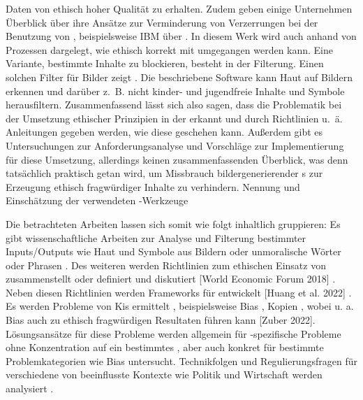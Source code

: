 Daten von ethisch hoher Qualität zu erhalten.
Zudem geben einige Unternehmen Überblick über ihre Ansätze zur Verminderung von Verzerrungen bei der Benutzung von , 
beispielsweise IBM über \cite{Hobson}. In diesem Werk wird auch anhand von Prozessen dargelegt, wie ethisch korrekt mit  
umgegangen werden kann.
Eine Variante, bestimmte Inhalte zu blockieren, besteht in der Filterung. Einen solchen Filter für Bilder zeigt \cite{Zheng}.
Die beschriebene Software kann Haut auf Bildern erkennen und darüber z. B. nicht kinder- und jugendfreie Inhalte und Symbole herausfiltern.
Zusammenfassend lässt sich also sagen, dass die Problematik bei der Umsetzung ethischer Prinzipien in der  erkannt und
durch Richtlinien u. ä. Anleitungen gegeben werden, wie diese geschehen kann. Außerdem gibt es Untersuchungen 
zur Anforderungsanalyse und Vorschläge zur Implementierung für diese Umsetzung, allerdings keinen zusammenfassenden 
Überblick, was denn tatsächlich praktisch getan wird, um Missbrauch bildergenerierender s zur Erzeugung ethisch 
fragwürdiger Inhalte zu verhindern.
Nennung und Einschätzung der verwendeten -Werkzeuge

Die betrachteten Arbeiten lassen sich somit wie folgt inhaltlich gruppieren: Es gibt wissenschaftliche Arbeiten zur Analyse und Filterung
bestimmter Inputs/Outputs wie Haut und Symbole aus Bildern \cite{Zheng} oder unmoralische Wörter oder Phrasen \cite{Shah}. Des weiteren 
werden Richtlinien zum ethischen Einsatz von  zusammenstellt oder definiert und diskutiert \cite{Ayling} \cite{Srinivasan} 
\cite{Jameel} \cite{Hagendorff} \cite{Jobin} \cite{Unity} \cite{EUCommision}[World Economic Forum 2018] \cite{Mueller}.
Neben diesen Richtlinien werden Frameworks für  entwickelt [Huang et al. 2022] \cite{Mueller}. Es werden Probleme von Kis ermittelt \cite{Ayling}, 
beispielsweise Bias \cite{Salminen} \cite{Jameel}, Kopien \cite{Somepalli}, wobei u. a. Bias auch zu ethisch 
fragwürdigen Resultaten führen kann [Zuber 2022]. Lösungsansätze für diese Probleme werden allgemein für -spezifische Probleme ohne 
Konzentration auf ein bestimmtes \cite{Ayling} \cite{Avelar}, aber auch konkret für bestimmte Problemkategorien wie Bias \cite{Srinivasan}
\cite{Jameel}untersucht. Technikfolgen und Regulierungsfragen für verschiedene von  beeinflusste Kontexte wie Politik und Wirtschaft
werden analysiert \cite{Pawelec}.
